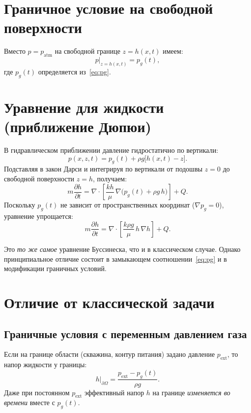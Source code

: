 \documentclass[12pt,a4paper]{article}
\begin{document}
\section{Граничное условие на свободной поверхности}

Вместо $p = p_{\mathrm{atm}}$ на свободной границе $z = h(x,t)$ имеем:
\begin{equation}\label{eq:bc_free}
  p\big|_{z=h(x,t)} = p_g(t),
\end{equation}
где $p_g(t)$ определяется из~\eqref{eq:pg}.

\section{Уравнение для жидкости (приближение Дюпюи)}

В гидравлическом приближении давление гидростатично по вертикали:
\begin{equation}\label{eq:hydrostatic}
  p(x, z, t) = p_g(t) + \rho g \bigl[h(x,t) - z\bigr].
\end{equation}
Подставляя в закон Дарси и интегрируя по вертикали от подошвы $z=0$ до свободной поверхности $z=h$, получаем:
\begin{equation}\label{eq:bous_full}
  m \frac{\partial h}{\partial t}
  = \nabla \cdot \left[\frac{k h}{\mu}\, \nabla \bigl(p_g(t) + \rho g\, h\bigr)\right] + Q.
\end{equation}
Поскольку $p_g(t)$ не зависит от пространственных координат ($\nabla p_g = 0$), уравнение упрощается:
\begin{equation}\label{eq:bous}
  \boxed{m \frac{\partial h}{\partial t}
  = \nabla \cdot \left[\frac{k \rho g}{\mu}\, h\, \nabla h\right] + Q.}
\end{equation}

Это \emph{то же самое} уравнение Буссинеска, что и в классическом случае. Однако принципиальное отличие состоит в замыкающем соотношении~\eqref{eq:pg} и в модификации граничных условий.

\section{Отличие от классической задачи}

\subsection{Граничные условия с переменным давлением газа}

Если на границе области (скважина, контур питания) задано давление $p_{\mathrm{ext}}$, то напор жидкости у границы:
\begin{equation}\label{eq:h_boundary}
  h\big|_{\partial\Omega} = \frac{p_{\mathrm{ext}} - p_g(t)}{\rho g}.
\end{equation}
Даже при постоянном $p_{\mathrm{ext}}$ эффективный напор $h$ на границе \emph{изменяется во времени} вместе с $p_g(t)$.
\end{document}
